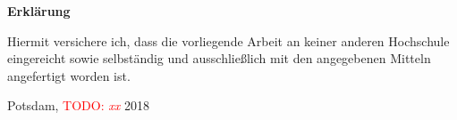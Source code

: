 \documentclass[11pt,DIV=13,BCOR=5mm,a4paper,headinclude]{scrbook}
\newcommand\todo[1]{\textcolor{red}{TODO: \textit{{#1}}}}
\begin{document}

\begingroup
\let\clearpage\relax
\renewcommand*{\chapterheadstartvskip}{\vspace*{-2\baselineskip}}
\begin{small}
 
 
\end{small}
\endgroup



\clearpage

\begin{center}
  {\Large\sffamily\bfseries Erklärung}
\end{center}

\vspace{\baselineskip}

Hiermit versichere ich, dass die vorliegende Arbeit an keiner anderen Hochschule eingereicht sowie selbständig und ausschließlich mit den angegebenen Mitteln angefertigt worden ist.\\

\begin{flushleft}
  Potsdam, \todo{xx} 2018
\end{flushleft}
\end{document}
